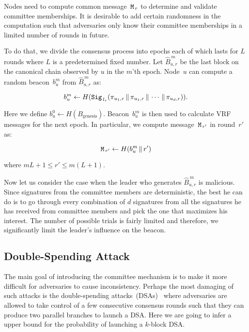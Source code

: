 \documentclass{article}
\begin{document}
Nodes need to compute common message~${\tt M}_{\,r}$ to determine and validate committee memberships. It is desirable to add certain randomness in the computation such that adversaries only know their committee memberships in a limited number of rounds in future.

To do that, we divide the consensus process into epochs each of which lasts for $L$ rounds where $L$ is a predetermined fixed number. Let $\hat{B}_{u,r}^{\,m}$ be the last block on the canonical chain observed by $u$ in the $m$'th epoch. Node~$u$ can compute a random beacon~$b_u^m$ from $\hat{B}_{u,r}^{\,m}$ as:

\begin{equation}
    b_u^m \leftarrow H({\tt Sig}_{\,l_r}(\pi_{u_1,r}\,\|\,\pi_{u_1,r}\,\|\,\cdots\,\|\,\pi_{u_d,r})).
\end{equation}

Here we define $b_u^0\leftarrow H(B_{\textrm{genesis}})$. Beacon~$b_u^m$ is then used to calculate VRF messages for the next epoch. In particular, we compute message~${\tt M}_{\,r'}$ in round~$r'$ as:

\begin{equation}
    {\tt M}_{\,r'} \leftarrow H(b_u^m\,\|\,r')
\end{equation}

where $mL+1\leq r'\leq m(L+1)$.

Now let us consider the case when the leader who generates $\hat{B}_{u,r}^{\,m}$ is malicious. Since signatures from the committee members are deterministic, the best he can do is to go through every combination of $d$ signatures from all the signatures he has received from committee members and pick the one that maximizes his interest. The number of possible trials is fairly limited and therefore, we significantly limit the leader's influence on the beacon.


\subsection{Double-Spending Attack}
The main goal of introducing the committee mechanism is to make it more difficult for adversaries to cause inconsistency. Perhaps the most damaging of such attacks is the double-spending attacks~(DSAs)~\cite{Sat08} where adversaries are allowed to take control of a few consecutive consensus rounds such that they can produce two parallel branches to launch a DSA. Here we are going to infer a upper bound for the probability of launching a $k$-block DSA. 
\end{document}
